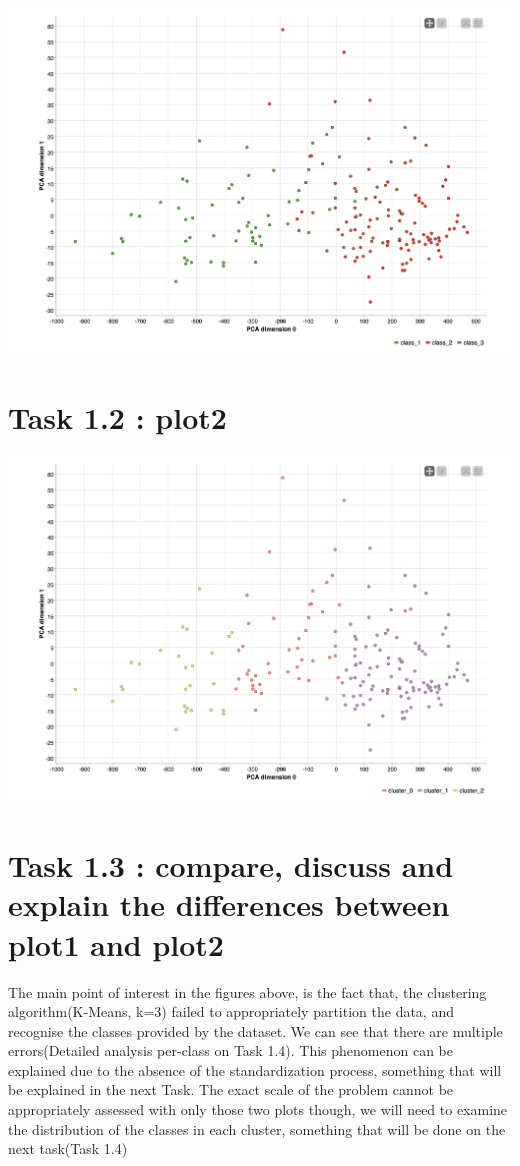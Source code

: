 \documentclass[12pt]{article}
\begin{document}
	 	\includegraphics[scale=0.36]{res/plot1.1}
	 
	 \section*{Task 1.2 : plot2}
	 
	 	\includegraphics[scale=0.36]{res/plot1.2}
	 
	 \section*{Task 1.3 : compare, discuss and explain the differences between plot1 and plot2}
		The main point of interest in the figures above, is the fact that, the clustering algorithm(K-Means, k=3) failed to appropriately partition the data, and recognise the classes provided by the dataset. We can see that there are multiple errors(Detailed analysis per-class on Task 1.4). This phenomenon can be explained due to the absence of the standardization process, something that will be explained in the next Task. The exact scale of the problem cannot be appropriately assessed with only those two plots though, we will need to examine the distribution of the classes in each cluster, something that will be done on the next task(Task 1.4)
	
\end{document}
